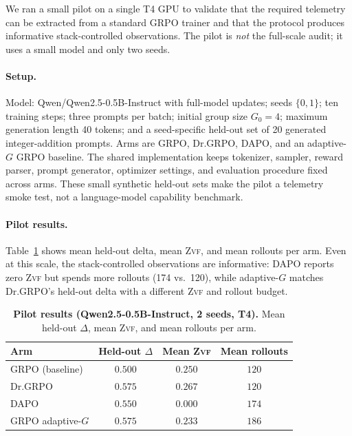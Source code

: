 \documentclass[11pt]{article}
\newcommand{\zvf}{\textsc{Zvf}}
\newcommand{\grpo}{\textsc{GRPO}}
\begin{document}
We ran a small pilot on a single T4 GPU to validate that the required telemetry
can be extracted from a standard GRPO trainer and that the protocol produces
informative stack-controlled observations. The pilot is \emph{not} the
full-scale audit; it uses a small model and only two seeds.

\paragraph{Setup.} Model: Qwen/Qwen2.5-0.5B-Instruct with full-model updates;
seeds $\{0,1\}$; ten training steps; three prompts per batch; initial group size
$G_0=4$; maximum generation length 40 tokens; and a seed-specific held-out set
of 20 generated integer-addition prompts. Arms are GRPO, Dr.\grpo{}, DAPO, and
an adaptive-$G$ GRPO baseline. The shared implementation keeps tokenizer,
sampler, reward parser, prompt generator, optimizer settings, and evaluation
procedure fixed across arms. These small synthetic held-out sets make the
pilot a telemetry smoke test, not a language-model capability benchmark.

\paragraph{Pilot results.} Table~\ref{tab:pilot} shows mean held-out delta,
mean \zvf{}, and mean rollouts per arm. Even at this scale, the stack-controlled
observations are informative: DAPO reports zero \zvf{} but spends more rollouts
(174 vs.\ 120), while adaptive-$G$ matches Dr.\grpo{}'s held-out delta with a
different \zvf{} and rollout budget.

\begin{table}[t]
\centering
\caption{\textbf{Pilot results (Qwen2.5-0.5B-Instruct, 2 seeds, T4).} Mean
  held-out $\Delta$, mean \zvf{}, and mean rollouts per arm.}
\label{tab:pilot}
\small
\begin{tabular}{@{}lccc@{}}
\toprule
\textbf{Arm} & \textbf{Held-out $\Delta$} & \textbf{Mean \zvf{}} &
\textbf{Mean rollouts}\\
\midrule
GRPO (baseline)          & $0.500$ & $0.250$ & $120$ \\
Dr.\grpo{}                & $0.575$ & $0.267$ & $120$ \\
DAPO                     & $0.550$ & $0.000$ & $174$ \\
GRPO adaptive-$G$        & $0.575$ & $0.233$ & $186$ \\
\bottomrule
\end{tabular}
\end{table}
\end{document}
